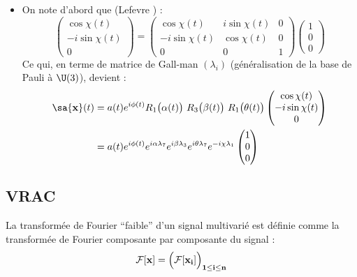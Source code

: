 \begin{itemize}
	\item On note d'abord que (Lefevre \cite{lefevre_polarization_2021}) :
	\[\begin{pmatrix}
		\cos\chi(t) \\ -i\sin\chi(t) \\ 0
	\end{pmatrix} = \begin{pmatrix}
		\cos\chi(t) & i\sin\chi(t) & 0 \\ -i\sin\chi(t) & \cos\chi(t) & 0 \\ 0 & 0 & 1
	\end{pmatrix}\begin{pmatrix}
		1 \\ 0 \\ 0
	\end{pmatrix}\]
	Ce qui, en terme de matrice de Gall-man $(\lambda_i)$ (généralisation de la base de Pauli à $\U(3)$), devient :
	\begin{align*}
		\sa{\bf{x}}(t) &= a(t)e^{i\phi(t)} R_1\big(\alpha(t)\big)\ R_3\big(\beta(t)\big)\ R_1\big(\theta(t)\big)\begin{pmatrix}
			\cos\chi(t) \\ -i\sin\chi(t) \\ 0
		\end{pmatrix} \\
		&= a(t)e^{i\phi(t)} e^{i\alpha \lambda_7} e^{i\beta \lambda_3} e^{i\theta \lambda_7} e^{-i\chi \lambda_1}\begin{pmatrix}
			1 \\ 0 \\ 0
		\end{pmatrix}
	\end{align*}
\end{itemize}




\subsection{VRAC}

\begin{definition}
	La transformée de Fourier ``faible'' d'un signal multivarié est définie comme la transformée de Fourier composante par composante du signal :
	\[\mathcal{F}[\bf{x}] = \Big(\mathcal{F}[x_i]\Big)_{1\leq i\leq n}\]
\end{definition}


